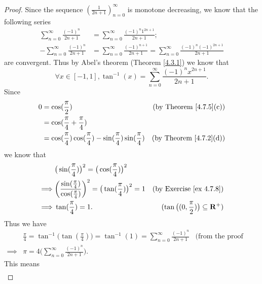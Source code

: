 \begin{proof}
    Since the sequence \((\frac{1}{2n + 1})_{n = 0}^\infty\) is monotone decreasing, we know that the following series
    \begin{align*}
        \sum_{n = 0}^\infty \frac{(-1)^n}{2n + 1}  & = \sum_{n = 0}^\infty \frac{(-1)^n 1^{2n + 1}}{2n + 1};                                                     \\
        -\sum_{n = 0}^\infty \frac{(-1)^n}{2n + 1} & = \sum_{n = 0}^\infty \frac{(-1)^{n + 1}}{2n + 1} = \sum_{n = 0}^\infty \frac{(-1)^n (-1)^{2n + 1}}{2n + 1}
    \end{align*}
    are convergent.
    Thus by Abel's theorem (Theorem \ref{4.3.1}) we know that
    \[
        \forall x \in [-1, 1], \tan^{-1}(x) = \sum_{n = 0}^\infty \frac{(-1)^n x^{2n + 1}}{2n + 1}.
    \]
    Since
    \begin{align*}
        0 & = \cos(\frac{\pi}{2})                                                               & \text{(by Theorem \ref{4.7.5}(c))} \\
          & = \cos(\frac{\pi}{4} + \frac{\pi}{4})                                                                                    \\
          & = \cos(\frac{\pi}{4}) \cos(\frac{\pi}{4}) - \sin(\frac{\pi}{4}) \sin(\frac{\pi}{4}) & \text{(by Theorem \ref{4.7.2}(d))}
    \end{align*}
    we know that
    \begin{align*}
                 & \big(\sin(\frac{\pi}{4})\big)^2 = \big(\cos(\frac{\pi}{4})\big)^2                                                                                       \\
        \implies & \bigg(\frac{\sin(\frac{\pi}{4})}{\cos(\frac{\pi}{4})}\bigg)^2 = \big(\tan(\frac{\pi}{4})\big)^2 = 1 & \text{(by Exercise \ref{ex 4.7.8})}               \\
        \implies & \tan(\frac{\pi}{4}) = 1.                                                                            & (\tan\big((0, \frac{\pi}{2})\big) \subseteq \mathbf{R}^+)
    \end{align*}
    Thus we have
    \begin{align*}
                 & \frac{\pi}{4} = \tan^{-1}\big(\tan(\frac{\pi}{4})\big) = \tan^{-1}(1) = \sum_{n = 0}^\infty \frac{(-1)^n}{2n + 1} & \text{(from the proof above)} \\
        \implies & \pi = 4 \bigg(\sum_{n = 0}^\infty \frac{(-1)^n}{2n + 1}\bigg).
    \end{align*}
    This means
    \begin{align*}

\end{align*}
\end{proof}
